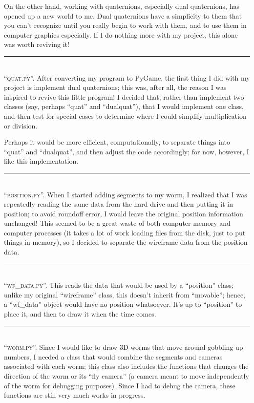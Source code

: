 \documentclass[10pt]{article}
\newcommand{\normaltitleize}[1]{\mbox{}\\ \textsc{#1} \normalsize}
\newcommand{\sectionline}{
\begin{center}
   \rule{1in}{.01in}
\end{center}
}
\begin{document}
On the other hand, working with quaternions, especially dual quaternions, has opened up a new world to me.  Dual quaternions have a simplicity to them that you can't recognize until you really begin to work with them, and to use them in computer graphics especially.  If I do nothing more with my project, this alone was worth reviving it!

\sectionline

\normaltitleize{``quat.py''.}  After converting my program to PyGame, the first thing I did with my project is implement dual quaternions; this was, after all, the reason I was inspired to revive this little program!  I decided that, rather than implement two classes (say, perhaps ``quat'' and ``dualquat''), that I would implement one class, and then test for special cases to determine where I could simplify multiplication or division.

Perhaps it would be more efficient, computationally, to separate things into ``quat'' and ``dualquat'', and then adjust the code accordingly; for now, however, I like this implementation.




\sectionline

\normaltitleize{``position.py''.}  When I started adding segments to my worm, I realized that I was repeatedly reading the same data from the hard drive and then putting it in position; to avoid roundoff error, I would leave the original position information unchanged!  This seemed to be a great waste of both computer memory and computer processes (it takes a lot of work loading files from the disk, just to put things in memory), so I decided to separate the wireframe data from the position data.




\sectionline

\normaltitleize{``wf\_data.py''.}  This reads the data that would be used by a ``position'' class; unlike my original ``wireframe'' class, this doesn't inherit from ``movable''; hence, a ``wf\_data'' object would have no position whatsoever.  It's up to ``position'' to place it, and then to draw it when the time comes.




\sectionline

\normaltitleize{``worm.py''.}  Since I would like to draw 3D worms that move around gobbling up numbers, I needed a class that would combine the segments and cameras associated with each worm; this class also includes the functions that changes the direction of the worm or its ``fly camera'' (a camera meant to move independently of the worm for debugging purposes).  Since I had to debug the camera, these functions are still very much works in progress.
\end{document}
